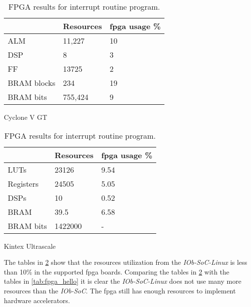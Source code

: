 \begin{table}[!ht]
    \begin{subtable}[h]{0.45\textwidth}
        \centering
        \begin{tabular}{l|l|l|}
            \cline{2-3}
                                              & Resources & \acrshort{fpga} usage \% \\ \hline
            \multicolumn{1}{|l|}{ALM}         & 11,227    & 10                       \\ \hline
            \multicolumn{1}{|l|}{DSP}         & 8         & 3                        \\ \hline
            \multicolumn{1}{|l|}{FF}          & 13725     & 2                        \\ \hline
            \multicolumn{1}{|l|}{BRAM blocks} & 234       & 19                       \\ \hline
            \multicolumn{1}{|l|}{BRAM bits}   & 755,424   & 9                        \\ \hline
        \end{tabular}
       \caption{Cyclone V GT}
       \label{tab:cyclone_linux}
    \end{subtable}
    \hfill
    \begin{subtable}[h]{0.45\textwidth}
        \centering
        \begin{tabular}{l|l|l|}
            \cline{2-3}
                                            & Resources & \acrshort{fpga} usage \% \\ \hline
            \multicolumn{1}{|l|}{LUTs}      & 23126     & 9.54                     \\ \hline
            \multicolumn{1}{|l|}{Registers} & 24505     & 5.05                     \\ \hline
            \multicolumn{1}{|l|}{DSPs}      & 10        & 0.52                     \\ \hline
            \multicolumn{1}{|l|}{BRAM}      & 39.5      & 6.58                     \\ \hline
            \multicolumn{1}{|l|}{BRAM bits} & 1422000   & -                        \\ \hline
        \end{tabular}
        \caption{Kintex Ultrascale}
        \label{tab:kintex_linux}
     \end{subtable}
     \caption{FPGA results for interrupt routine program.}
     \label{tab:fpga_linux}
\end{table}

The tables in \ref{tab:fpga_linux} show that the resources utilization from the \textit{IOb-SoC-Linux} is less than 10\% in the supported \acrshort{fpga} boards. Comparing the tables in \ref{tab:fpga_linux} with the tables in \ref{tab:fpga_hello} it is clear the \textit{IOb-SoC-Linux} does not use many more resources than the \textit{IOb-SoC}. The \acrshort{fpga} still has enough resources to implement hardware accelerators.
